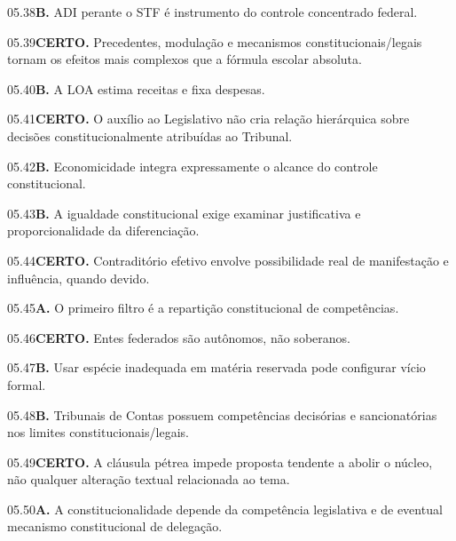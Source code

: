 \begin{solucao}{05.38}\textbf{B.} ADI perante o STF é instrumento do controle concentrado federal.\end{solucao}
\begin{solucao}{05.39}\textbf{CERTO.} Precedentes, modulação e mecanismos constitucionais/legais tornam os efeitos mais complexos que a fórmula escolar absoluta.\end{solucao}
\begin{solucao}{05.40}\textbf{B.} A LOA estima receitas e fixa despesas.\end{solucao}
\begin{solucao}{05.41}\textbf{CERTO.} O auxílio ao Legislativo não cria relação hierárquica sobre decisões constitucionalmente atribuídas ao Tribunal.\end{solucao}
\begin{solucao}{05.42}\textbf{B.} Economicidade integra expressamente o alcance do controle constitucional.\end{solucao}
\begin{solucao}{05.43}\textbf{B.} A igualdade constitucional exige examinar justificativa e proporcionalidade da diferenciação.\end{solucao}
\begin{solucao}{05.44}\textbf{CERTO.} Contraditório efetivo envolve possibilidade real de manifestação e influência, quando devido.\end{solucao}
\begin{solucao}{05.45}\textbf{A.} O primeiro filtro é a repartição constitucional de competências.\end{solucao}
\begin{solucao}{05.46}\textbf{CERTO.} Entes federados são autônomos, não soberanos.\end{solucao}
\begin{solucao}{05.47}\textbf{B.} Usar espécie inadequada em matéria reservada pode configurar vício formal.\end{solucao}
\begin{solucao}{05.48}\textbf{B.} Tribunais de Contas possuem competências decisórias e sancionatórias nos limites constitucionais/legais.\end{solucao}
\begin{solucao}{05.49}\textbf{CERTO.} A cláusula pétrea impede proposta tendente a abolir o núcleo, não qualquer alteração textual relacionada ao tema.\end{solucao}
\begin{solucao}{05.50}\textbf{A.} A constitucionalidade depende da competência legislativa e de eventual mecanismo constitucional de delegação.\end{solucao}
